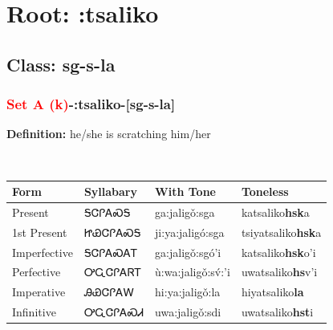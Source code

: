 \needspace{4in}
\section*{Root: :tsaliko}
\nopagebreak
{}
\needspace{3in}
\subsection*{Class: sg-s-la}
\nopagebreak
\needspace{2in}
\subsubsection*{\textcolor{Red}{Set A (k)}{-}\textbf{:tsaliko}{-}[sg-s-la]}
\nopagebreak
\textbf{Definition: } he/she is scratching him/her
\\[0.5em]
\begin{tabularx}{\textwidth}{l X X X}%
\toprule%
\textbf{Form}&\textbf{Syllabary}&\textbf{With Tone}&\textbf{Toneless}\\%
\midrule%
Present&ᎦᏣᎵᎪᏍᎦ&ga:jaligǒ:sga&katsaliko\textbf{hsk}a\\%
1st Present&ᏥᏯᏣᎵᎪᏍᎦ&ji:ya:jaligó:sga&tsiyatsaliko\textbf{hsk}a\\%
Imperfective&ᎦᏣᎵᎪᏍᎪᎢ&ga:jaligǒ:sgó’i&katsaliko\textbf{hsk}o'i\\%
Perfective&ᎤᏩᏣᎵᎪᏒᎢ&ù:wa:jaligǒ:sv́:’i&uwatsaliko\textbf{hs}v'i\\%
Imperative&ᎯᏯᏣᎵᎪᎳ&hi:ya:jaligǒ:la&hiyatsaliko\textbf{la}\\%
Infinitive&ᎤᏩᏣᎵᎪᏍᏗ&uwa:jaligǒ:sdi&uwatsaliko\textbf{hst}i\\%
\bottomrule%
\end{tabularx}
\\[1em]
